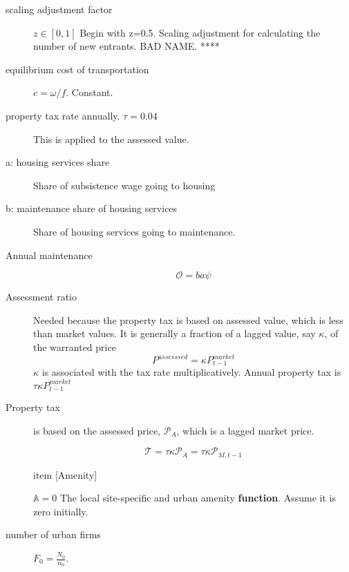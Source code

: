 \begin{description}
\item [scaling adjustment factor] $z\in[0,1]$ Begin with z=0.5. Scaling adjustment for calculating the number of new entrants. BAD NAME. ****

\item [equilibrium cost of transportation] $c = \omega/f$. Constant.
\item [property tax rate annually. $\tau=0.04$] This is applied to the assessed value.

\item[a: housing services share] Share of subsistence wage going to housing 




\item[b: maintenance share  of housing services ] Share of housing services going to maintenance.

\item [Annual maintenance]
\[\mathcal{O}=   ba\psi \]

\item[Assessment ratio] 
Needed because the property tax is based on assessed value, which is less than market values. It is generally a fraction of a lagged value, say $\kappa$,  of the warranted price
\[P^{assesssed}=  \kappa P_{t-1}^{market}\]
$\kappa$ is associated with the tax rate multiplicatively. Annual property tax is $\tau\kappa P_{t-1}^{market}$

\item [Property tax] is based on the assessed price, $\mathcal{P}_{A}$, which is a lagged market price.

\[\mathcal{T} = \tau\kappa  \mathcal{P}_{A} =  \tau\kappa \mathcal{P}_{M, t-1} \]



item [Amenity]

$\mathbb{A}=0$
The local site-specific and urban amenity \textbf{function}. %
 Assume it is zero initially.




\item[number of urban firms]  $F_0=\frac{N_0}{n_0}$. %


\end{description}
